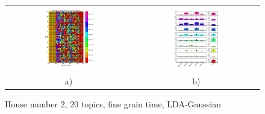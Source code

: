 \begin{figure}[h!]
 \centering
 \begin{tabular}{c c}
  \includegraphics[width=0.45\textwidth]{Pictures/Gaus/fine/DayHN2TS48k20fine.png}
  &
  \includegraphics[width=0.45\textwidth]{Pictures/Gaus/fine/TopHN2TS48k20fine.png}\\
  a) & b)
 \end{tabular}
  \caption{House number 2, 20 topics, fine grain time, LDA-Gaussian}
\end{figure}

